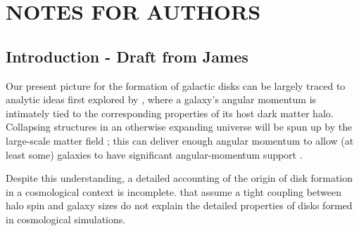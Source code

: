 \documentclass[fleqn,usenatbib]{mnras}
\begin{document}


\section{NOTES FOR AUTHORS}

\subsection{Introduction - Draft from James}

Our present picture for the formation of galactic disks  can be largely traced to analytic ideas first explored by \citet{fall1980}, where a galaxy's angular momentum is intimately tied to the corresponding properties of its host dark matter halo.  Collapsing structures in an otherwise expanding universe will be spun up by the large-scale matter field \citep{Peebles69};  this can deliver enough angular momentum to allow (at least some) galaxies to have significant angular-momentum support \citep[e.g.][]{MMW98}. 

Despite this understanding, a detailed accounting of the origin of  disk formation in a cosmological context is incomplete. 
that assume a tight coupling between halo spin and galaxy sizes do not explain the detailed properties of disks formed in cosmological simulations\citep[e.g.][]{GK18}.  
\end{document}
